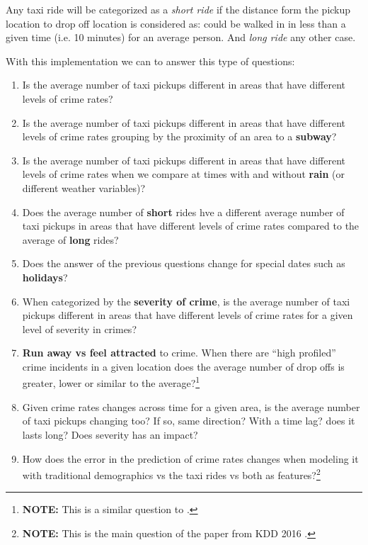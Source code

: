 \documentclass{sigkddExp}
\begin{document}
Any taxi ride will be categorized as a \textit{short ride} if the distance form the pickup location to drop off location is considered as: could be walked in in less than a given time (i.e. 10 minutes) for an average person. And \textit{long ride} any other case.

With this implementation we  can to answer this type of questions:
\begin{enumerate}
       \item Is the average number of taxi pickups different in areas that have different levels of crime rates?

       \item Is the average number of taxi pickups different in areas that have different levels of crime rates grouping by the proximity of an area to a \textbf{subway}? 

       \item Is the average number of taxi pickups different in areas that have different levels of crime rates when we compare at times with and without \textbf{rain} (or different weather variables)?

       \item Does the average  number of \textbf{short} rides hve a different average number of taxi pickups  in areas that have different levels of crime rates  compared to the average of \textbf{long} rides?

       \item Does the answer of the previous questions change for special dates such as \textbf{holidays}?

       \item When categorized by the \textbf{severity of crime}, is the average number of taxi pickups different in areas that have different levels of crime rates for a given level of severity in crimes?

       \item \textbf{Run away vs feel attracted} to crime. When there are ``high profiled'' crime incidents in a given location does the average number of drop offs is greater, lower or similar to the average?\footnote{\textbf{NOTE:} This is a similar question to \cite{Bendler14}.}

       \item Given crime rates changes across time for a given area, is the average number of taxi pickups  changing too? If so, same direction? With a time lag?
       does it lasts long? Does severity has an impact?

       \item How does the error in the prediction of crime rates changes when modeling it with traditional demographics vs the taxi rides vs both as features?\footnote{
       \textbf{NOTE:} This is the main question of the paper from KDD 2016 \cite{Wang16}. }

\end{enumerate}
\end{document}
